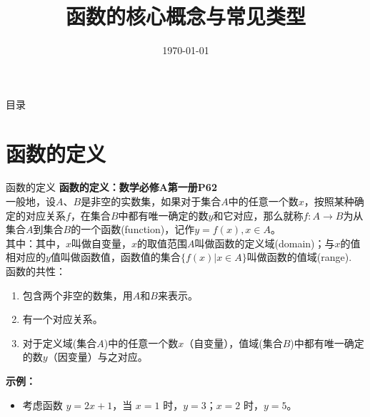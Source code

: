 \documentclass[aspectratio=169]{ctexbeamer} %
\date{\today}
\title{函数的核心概念与常见类型}
\begin{document}
\begin{frame}
    \titlepage
\end{frame}

\begin{frame}{目录}
    \tableofcontents
\end{frame}

\section{函数的定义}

\begin{frame}{函数的定义}
    \textbf{函数的定义：数学必修A第一册P62} \\
    一般地，设$A$、$B$是非空的实数集，如果对于集合$A$中的任意一个数$x$，按照某种确定的对应关系$f$，在集合$B$中都有唯一确定的数$y$和它对应，那么就称$f: A→B$为从集合$A$到集合$B$的一个\alert{函数(function)}，记作\alert{$y = f(x), x \in A$}。\\
    其中：其中，$x$叫做\alert{自变量}，$x$的取值范围$A$叫做函数的\alert{定义域(domain)}；与$x$的值相对应的$y$值叫做\alert{函数值}，函数值的集合$\{f(x)| x \in A\}$叫做函数的\alert{值域(range)}. \\
    函数的共性：
    \begin{enumerate}[label={\arabic*.}]
    		\item 包含两个非空的数集，用$A$和$B$来表示。
        \item 有一个对应关系。
        \item 对于定义域(集合$A$)中的任意一个数$x$（自变量），值域(集合$B$)中都有唯一确定的数$y$（因变量）与之对应。
    \end{enumerate}

    \vspace{0.5cm}
    \textbf{示例：}
    \begin{itemize}
        \item 考虑函数 \( y = 2x + 1 \)，当 \( x = 1 \) 时，\( y = 3 \)；\( x = 2 \) 时，\( y = 5 \)。
    \end{itemize}
\end{frame}

\end{document}
